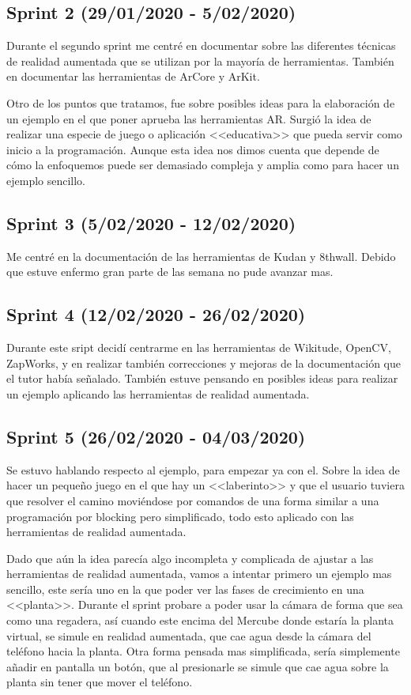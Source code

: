 \subsection{Sprint 2 (29/01/2020 - 5/02/2020)}
Durante el segundo sprint me centré en documentar sobre las diferentes técnicas de realidad aumentada que se utilizan por la mayoría de herramientas.
También en documentar las herramientas de ArCore y ArKit.

Otro de los puntos que tratamos, fue sobre posibles ideas para la elaboración de un ejemplo en el que poner aprueba las herramientas AR. Surgió la idea de realizar una especie de juego o aplicación <<educativa>> que pueda servir como inicio a la programación. Aunque esta idea nos dimos cuenta que depende de cómo la enfoquemos puede ser demasiado compleja y amplia como para hacer un ejemplo sencillo.
\subsection{Sprint 3 (5/02/2020 - 12/02/2020)}

Me centré en la documentación de las herramientas de Kudan y 8thwall.
Debido que estuve enfermo gran parte de las semana no pude avanzar mas.
\subsection{Sprint 4 (12/02/2020 - 26/02/2020)}
Durante este sript decidí centrarme en las herramientas de Wikitude, OpenCV, ZapWorks, y en realizar también correcciones y mejoras de la documentación que el tutor había señalado.
También estuve pensando en posibles ideas para realizar un ejemplo aplicando las herramientas de realidad aumentada. 
\subsection{Sprint 5 (26/02/2020 - 04/03/2020)}
Se estuvo hablando respecto al ejemplo, para empezar ya con el. Sobre la idea de hacer un pequeño juego en el que hay un <<laberinto>> y que el usuario tuviera que resolver el camino moviéndose por comandos de una forma similar a una programación por blocking pero simplificado, todo esto aplicado con las herramientas de realidad aumentada. 

Dado que aún la idea parecía algo incompleta y complicada de ajustar a las herramientas de realidad aumentada, vamos a intentar primero un ejemplo mas sencillo, este sería uno en la que poder ver las fases de crecimiento en una <<planta>>. 
Durante el sprint probare a poder usar la cámara de forma que sea como una regadera, así cuando este encima del Mercube donde estaría la planta virtual, se simule en realidad aumentada, que cae agua desde la cámara del teléfono hacia la planta. Otra forma pensada mas simplificada, sería simplemente añadir en pantalla un botón, que al presionarle se simule que cae agua sobre la planta sin tener que mover el teléfono.

